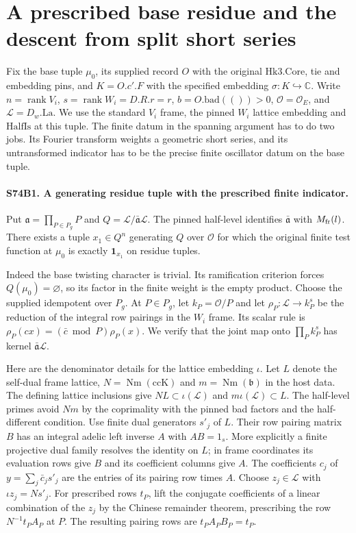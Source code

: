 \section*{A prescribed base residue and the descent from split short series}

Fix the base tuple $\mu _0$, its supplied record $O$ with the original
$\mathrm{Hk3.Core}$, tie and embedding pins, and
$K=O.c'.F$ with the specified embedding $\sigma:K\hookrightarrow
\mathbb C$. Write $n=\operatorname{rank}V_i$, $s=\operatorname{rank}W_i=D.R.r=r$, $b=O.\mathrm{bad}(())>0$,
$\mathcal O=\mathcal O_E$, and $\mathcal L=D_w.\mathrm{La}$.
We use the standard $V_i$ frame, the pinned $W_i$ lattice embedding
and $\mathrm{HalfIs}$ at this tuple. The finite datum in the spanning
argument has to do two jobs. Its
Fourier transform weights a geometric short series, and its untransformed
indicator has to be the precise finite oscillator datum on the base tuple.

\paragraph{S74B1. A generating residue tuple with the prescribed finite indicator.}
Put $\mathfrak a=\prod_{P\in P_g}P$ and
$Q=\mathcal L/\bar{\mathfrak a}\mathcal L$.
The pinned half-level identifies $\bar{\mathfrak a}$ with
$M_{\rm fr}(l)$. There exists a tuple $x_1\in Q^n$ generating $Q$
over $\mathcal O$ for which the original finite test function at
$\mu _0$ is exactly $\mathbf1_{x_1}$ on residue tuples.

Indeed the base twisting character is trivial. Its ramification
criterion forces $Q(\mu _0)=\varnothing$, so its factor in the finite
weight is the empty product. Choose the supplied idempotent over
$P_g$. At $P\in P_g$, let $k_P=\mathcal O/P$ and let
$\rho_P:\mathcal L\to k_P^s$ be the reduction of the integral row
pairings in the $W_i$ frame. Its scalar rule is
$\rho_P(c x)=(\bar c\bmod P)\rho_P(x)$. We verify that the joint
map onto $\prod_P k_P^s$ has kernel $\bar{\mathfrak a}\mathcal L$.

Here are the denominator details for the lattice embedding $\iota$.
Let $L$ denote the self-dual frame lattice, $N=\operatorname{Nm}(\mathrm{ccK})$
and $m=\operatorname{Nm}(\mathfrak b)$ in the host data.
The defining lattice inclusions give
$N L\subset\iota(\mathcal L)$ and $m\iota(\mathcal L)\subset L$.
The half-level primes avoid $Nm$ by the coprimality with the pinned
bad factors and the half-different condition. Use finite dual
generators $s'_j$ of $L$. Their row pairing matrix $B$ has an integral
adelic left inverse $A$ with $AB=1_s$. More explicitly a finite
projective dual family resolves the identity on $L$; in frame
coordinates its evaluation rows give $B$ and its coefficient columns
give $A$. The coefficients $c_j$ of $y=\sum_j\bar c_j s'_j$ are the
entries of its pairing row times $A$. Choose $z_j\in\mathcal L$ with
$\iota z_j=Ns'_j$. For prescribed rows $t_P$, lift the conjugate
coefficients of a linear combination of the $z_j$ by the Chinese
remainder theorem, prescribing the row $N^{-1}t_PA_P$ at $P$.
The resulting pairing rows are $t_PA_PB_P=t_P$.

